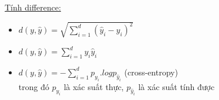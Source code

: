 \documentclass{article}
\begin{document}
\underline{Tính difference: } \\
\begin{itemize}
    \item $d(y,\hat{y}) = \sqrt{\sum_{i=1}^d(\hat{y}_i-y_i)^2}$ 
    \item $d(y,\hat{y}) = \sum_{i=1}^d y_i\hat{y}_i$
    \item $d(y,\hat{y}) = -\sum_{i=1}^d p_{y_i}.log p_{\hat{y}_i}$ (cross-entropy) \\
    trong đó $p_{y_i}$ là xác suất thực, $p_{\hat{y}_i}$ là xác suất tính được
\end{itemize}
\end{document}

